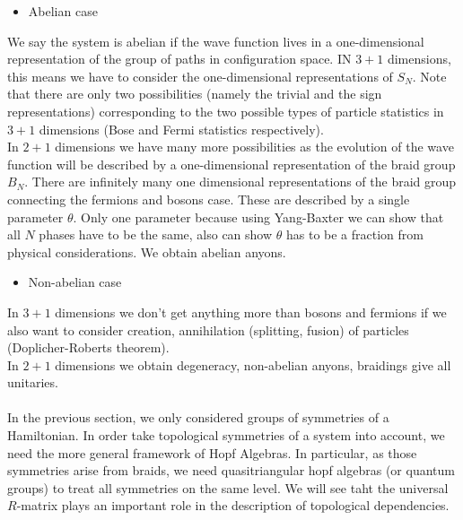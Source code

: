 \documentclass{article}
\begin{document}
\begin{itemize}
    \item Abelian case
\end{itemize}
We say the system is abelian if the wave function lives in a one-dimensional representation of the group of paths in configuration space. IN $3+1$ dimensions, this means we have to consider the one-dimensional representations of $S_N$. Note that there are only two possibilities (namely the trivial and the sign representations) corresponding to the two possible types of particle statistics in $3+1$ dimensions (Bose and Fermi statistics respectively). \\
In $2+1$ dimensions we have many more possibilities as the evolution of the wave function will be described by a one-dimensional representation of the braid group $B_N$. There are infinitely many one dimensional representations of the braid group connecting the fermions and bosons case. These are described by a single parameter $\theta$. Only one parameter because using Yang-Baxter we can show that all $N$ phases have to be the same, also can show $\theta$ has to be a fraction from physical considerations. We obtain abelian anyons. \\
\begin{itemize}
    \item Non-abelian case
\end{itemize}
In $3+1$ dimensions we don't get anything more than bosons and fermions if we also want to consider creation, annihilation (splitting, fusion) of particles (Doplicher-Roberts theorem).\\
In $2+1$ dimensions we obtain degeneracy, non-abelian anyons, braidings give all unitaries.\\~\\
In the previous section, we only considered groups of symmetries of a Hamiltonian. In order take topological symmetries of a system into account, we need the more general framework of Hopf Algebras. In particular, as those symmetries arise from braids, we need quasitriangular hopf algebras (or quantum groups) to treat all symmetries on the same level. We will see taht the universal $R$-matrix plays an important role in the description of topological dependencies.\\

\end{document}
